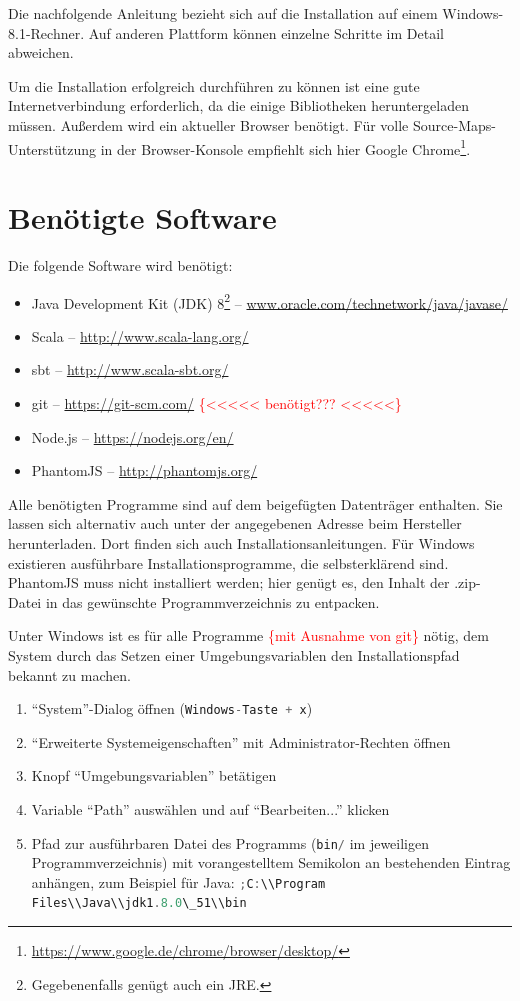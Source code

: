 \documentclass[a4paper, 12pt, hidelinks, listof=totoc, listoftables=totoc, bibliography=totoc]{scrreprt}
\newcommand{\code}[1]{\lstinline[language=Scala, style=inline]|#1|}
\newcommand{\TODOi}[1]{\textcolor{red}{\{#1\}}}
\begin{document}
Die nachfolgende Anleitung bezieht sich auf die Installation auf einem Windows-8.1-Rechner. Auf anderen Plattform können einzelne Schritte im Detail abweichen.

Um die Installation erfolgreich durchführen zu können ist eine gute Internetverbindung erforderlich, da die einige Bibliotheken heruntergeladen müssen. Außerdem wird ein aktueller Browser benötigt. Für volle Source-Maps-Unterstützung in der Browser-Konsole empfiehlt sich hier Google Chrome\footnote{\url{https://www.google.de/chrome/browser/desktop/}}.

\section{Benötigte Software}

Die folgende Software wird benötigt:

\begin{itemize}
	\item Java Development Kit (JDK) 8\footnote{Gegebenenfalls genügt auch ein JRE.}  --  \url{www.oracle.com/technetwork/java/javase/}
	\item Scala  --  \url{http://www.scala-lang.org/}
	\item sbt  --  \url{http://www.scala-sbt.org/}
	\item git  --  \url{https://git-scm.com/} \TODOi{<<<<< benötigt??? <<<<<}
	\item Node.js  --  \url{https://nodejs.org/en/}
	\item PhantomJS  --  \url{http://phantomjs.org/}
\end{itemize}

Alle benötigten Programme sind auf dem beigefügten Datenträger enthalten. Sie lassen sich alternativ auch unter der angegebenen Adresse beim Hersteller herunterladen. Dort finden sich auch Installationsanleitungen. Für Windows existieren ausführbare Installationsprogramme, die selbsterklärend sind. PhantomJS muss nicht installiert werden; hier genügt es, den Inhalt der .zip-Datei in das gewünschte Programmverzeichnis zu entpacken.

Unter Windows ist es für alle Programme \TODOi{mit Ausnahme von git} nötig, dem System durch das Setzen einer Umgebungsvariablen den Installationspfad bekannt zu machen.


\begin{enumerate}
\item "`System"'-Dialog öffnen (\code{Windows-Taste + x})
\item "`Erweiterte Systemeigenschaften"' mit Administrator-Rechten öffnen
\item Knopf "`Umgebungsvariablen"' betätigen
\item Variable "`Path"' auswählen und auf "`Bearbeiten..."' klicken
\item Pfad zur ausführbaren Datei des Programms (\code{bin/} im jeweiligen Programmverzeichnis) mit vorangestelltem Semikolon an bestehenden Eintrag anhängen, zum Beispiel für Java: \code{;C:\\Program Files\\Java\\jdk1.8.0\_51\\bin}
\end{enumerate}
\end{document}

